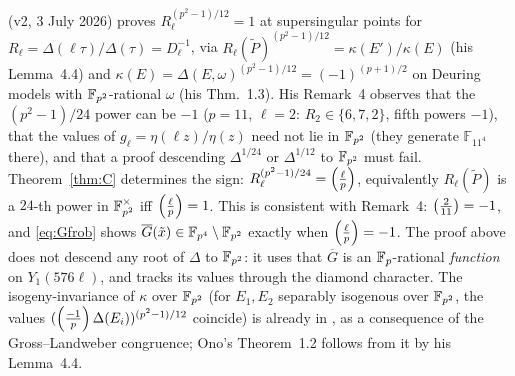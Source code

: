 \begin{remark}\label{rem:ono}
\citet[Thm.~1.2]{Ono25} (v2, 3 July 2026) proves $R_\ell^{(p^2-1)/12}=1$ at supersingular points
for $R_\ell=\Delta(\ell\tau)/\Delta(\tau)=D_\ell^{-1}$, via $R_\ell(\tilde P)^{(p^2-1)/12}=\kappa(E')/\kappa(E)$
(his Lemma~4.4) and $\kappa(E)=\Delta(E,\omega)^{(p^2-1)/12}=(-1)^{(p+1)/2}$ on Deuring models with
$\mathbb F_{p^2}$-rational $\omega$ (his Thm.~1.3). His Remark~4 observes that the $(p^2-1)/24$ power can be $-1$
($p=11$, $\ell=2$: $R_2\in\{6,7,2\}$, fifth powers $-1$), that the values of
$g_\ell=\eta(\ell z)/\eta(z)$ need not lie in $\mathbb F_{p^2}$ (they generate $\mathbb F_{11^4}$ there), and that
a proof descending $\Delta^{1/24}$ or $\Delta^{1/12}$ to $\mathbb F_{p^2}$ must fail. Theorem~\ref{thm:C}
determines the sign: $R_\ell^{(p^2-1)/24}=\left(\frac{\ell}{p}\right)$, equivalently $R_\ell(\tilde P)$ is a
$24$-th power in $\mathbb F_{p^2}^\times$ iff $\left(\frac{\ell}{p}\right)=1$. This is consistent with Remark~4: $\left(\frac{2}{11}\right)=-1$,
and \eqref{eq:Gfrob} shows $\overline G(\tilde x)\in\mathbb F_{p^4}\setminus\mathbb F_{p^2}$ exactly when
$\left(\frac{\ell}{p}\right)=-1$. The proof above does not descend any root of $\Delta$ to $\mathbb F_{p^2}$: it uses that
$\overline G$ is an $\mathbb F_p$-rational \emph{function} on $Y_1(576\ell)$, and tracks its values through
the diamond character. The isogeny-invariance of $\kappa$ over $\mathbb F_{p^2}$ (for $E_1,E_2$ separably isogenous over $\mathbb F_{p^2}$,
the values $(\left(\frac{-1}{p}\right)\Delta(E_i))^{(p^2-1)/12}$ coincide) is already in \citet[\S2]{Baker98}, as a
consequence of the Gross--Landweber congruence; Ono's Theorem~1.2 follows from it by his Lemma~4.4.
\end{remark}

